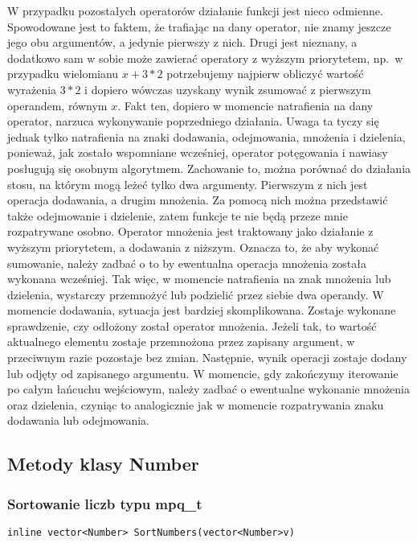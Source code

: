 W przypadku pozostałych operatorów działanie funkcji jest nieco odmienne. Spowodowane jest to faktem, że trafiając na dany operator, nie znamy jeszcze jego obu argumentów, a jedynie pierwszy z nich. Drugi jest nieznany, a dodatkowo sam w sobie może zawierać operatory z wyższym priorytetem, np.\ w przypadku wielomianu $x+3*2$ potrzebujemy najpierw obliczyć wartość wyrażenia $3*2$ i dopiero wówczas uzyskany wynik zsumować z pierwszym operandem, równym $x$. Fakt ten, dopiero w momencie natrafienia na dany operator, narzuca wykonywanie poprzedniego działania. Uwaga ta tyczy się jednak tylko natrafienia na znaki dodawania, odejmowania, mnożenia i dzielenia, ponieważ, jak zostało wspomniane wcześniej, operator potęgowania i nawiasy posługują się osobnym algorytmem. Zachowanie to, można porównać do działania stosu, na którym mogą leżeć tylko dwa argumenty. Pierwszym z nich jest operacja dodawania, a drugim mnożenia. Za pomocą nich można przedstawić także odejmowanie i dzielenie, zatem funkcje te nie będą przeze mnie rozpatrywane osobno. Operator mnożenia jest traktowany jako działanie z wyższym priorytetem, a dodawania z niższym. Oznacza to, że aby wykonać sumowanie, należy zadbać o to by ewentualna operacja mnożenia została wykonana wcześniej. Tak więc, w momencie natrafienia na znak mnożenia lub dzielenia, wystarczy przemnożyć lub podzielić przez siebie dwa operandy. W momencie dodawania, sytuacja jest bardziej skomplikowana. Zostaje wykonane sprawdzenie, czy odłożony został operator mnożenia. Jeżeli tak, to wartość aktualnego elementu zostaje przemnożona przez zapisany argument, w przeciwnym razie pozostaje bez zmian. Następnie, wynik operacji zostaje dodany lub odjęty od zapisanego argumentu. W momencie, gdy zakończymy iterowanie po całym łańcuchu wejściowym, należy zadbać o ewentualne wykonanie mnożenia oraz dzielenia, czyniąc to analogicznie jak w momencie rozpatrywania znaku dodawania lub odejmowania.

\subsection{Metody klasy Number}

\subsubsection{Sortowanie liczb typu mpq\_t}
\begin{lstlisting}
inline vector<Number> SortNumbers(vector<Number>v)
\end{lstlisting}

